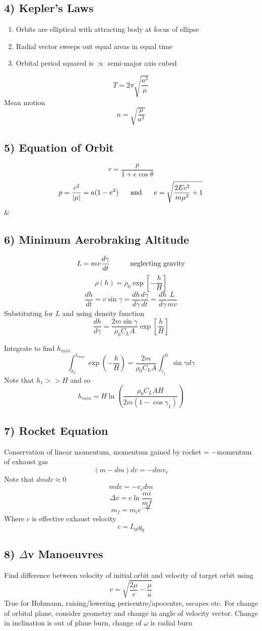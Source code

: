 \documentclass[table,cmyk,fleqn]{article}
\begin{document}
\begin{longtable}
\subsection*{4) Kepler's Laws}
\begin{enumerate}
\item {Orbits are elliptical with attracting body at focus of ellipse}

\item {Radial vector sweeps out equal areas in equal time}

\item {Orbital period squared is $\propto$ semi-major axis cubed}
\end{enumerate}
\[T = 2\pi \sqrt{\frac{a^3}{\mu}}\]
Mean motion
\[n = \sqrt{\frac{\mu}{a^3}}\]
\subsection*{5) Equation of Orbit}
\[r = \frac{p}{1+e\cos \theta}\]
\[p = \frac{c^2}{|\mu|}=a(1-e^2)\text{\hspace{0.6cm}and\hspace{0.6cm}}e = \sqrt{\frac{2Ec^2}{m\mu^2}+1}\]
&
\subsection*{6) Minimum Aerobraking Altitude}
\[L = mv\frac{d\gamma}{dt}\text{\hspace{1cm}neglecting gravity}\]
\[\rho(h) = \rho_0\exp \left[-\frac{h}{H}\right]\]
\[\frac{dh}{dt} = v\sin \gamma = \frac{dh}{d\gamma}\frac{d\gamma}{dt} = \frac{dh}{d\gamma}\frac{L}{mv}\]
Substituting for $L$ and using density function
\[\frac{dh}{d\gamma} = \frac{2m\sin \gamma}{\rho_0 C_L A} \exp\left[\frac{h}{H}\right]\]

Integrate to find $h_{min}$
\[\int_{h_1}^{h_{min}}\exp \left( -\frac{h}{H}\right) = \frac{2m}{\rho_0 C_L A}\int_{\gamma_1}^{0}\sin \gamma d \gamma\]
Note that $h_1 >> H$ and so
\[h_{min} = H\ln \left( \frac{\rho_0C_LAH}{2m(1-\cos \gamma_1)}\right)\]
\subsection*{7) Rocket Equation}
Conservation of linear momentum, momentum gained by rocket = $-$momentum of exhaust gas
\[(m-dm)dv = -dm v_e\]
Note that $dmdv \approx 0$
\[mdv = -v_edm\]
\[\Delta v = c \ln \frac{mi}{mf}\]
\[m_f = m_i e^{-\frac{\Delta v}{c}}\]
Where $c$ is effective exhaust velocity
\[c = I_{sp}g_0\]
\subsection*{8) $\Delta$v Manoeuvres}
Find difference between velocity of initial orbit and velocity of target orbit using
\[v =\sqrt{\frac{2\mu}{r}-\frac{\mu}{a}}\]
True for Hohmann, raising/lowering pericentre/apocentre, escapes etc.
For change of orbital plane, consider geometry and change in angle of velocity vector. Change in inclination is out of plane burn, change of $\omega$ is radial burn


\end{longtable}
\end{document}
